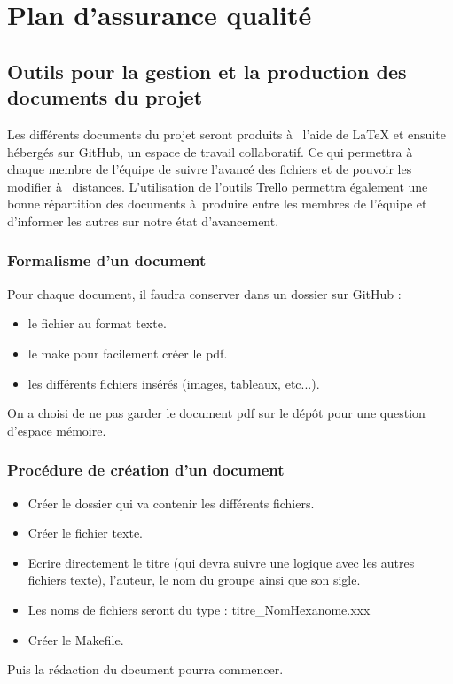 \chapter{Plan d'assurance qualité}

\section{Outils pour la gestion et la production des documents du projet}

    Les différents documents du projet seront produits à  l'aide de LaTeX et ensuite hébergés sur GitHub, un espace de travail collaboratif. Ce qui permettra à  chaque membre de l'équipe de suivre l'avancé des fichiers et de pouvoir les modifier à  distances.
    L'utilisation de l'outils Trello permettra également une bonne répartition des documents à produire entre les membres de l'équipe et d'informer les autres sur notre état d'avancement.

\subsection{Formalisme d'un document}

Pour chaque document, il faudra conserver dans un dossier sur GitHub :
\begin{itemize}
    \item le fichier au format texte.
    \item le make pour facilement créer le pdf.
    \item les différents fichiers insérés (images, tableaux, etc...).
\end{itemize}
On a choisi de ne pas garder le document pdf sur le dépôt pour une question d'espace mémoire.
\subsection{Procédure de création d'un document}

\begin{itemize}
    \item Créer le dossier qui va contenir les différents fichiers.
    \item Créer le fichier texte.
    \item Ecrire directement le titre (qui devra suivre une logique avec les autres fichiers texte), l'auteur, le nom du groupe ainsi que son sigle.
    \item Les noms de fichiers seront du type : titre\_NomHexanome.xxx
   \item Créer le Makefile.
\end{itemize}
Puis la rédaction du document pourra commencer.

